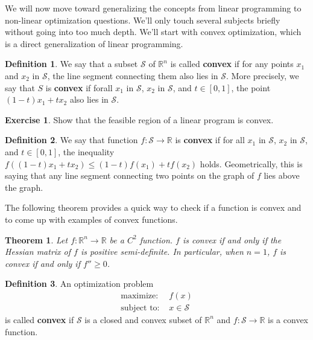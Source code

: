 \documentclass[
]{book}
\newtheorem{theorem}{Theorem}[chapter]
\theoremstyle{definition}
\newtheorem{definition}{Definition}[chapter]
\theoremstyle{definition}
\theoremstyle{definition}
\newtheorem{exercise}{Exercise}[chapter]
\theoremstyle{definition}
\theoremstyle{remark}
\begin{document}
We will now move toward generalizing the concepts from linear programming to non-linear optimization questions.
We'll only touch several subjects briefly without going into too much depth.
We'll start with convex optimization, which is a direct generalization of linear programming.

\begin{definition}
We say that a subset \(\mathcal{S}\) of \(\mathbb{R}^n\) is called \textbf{convex} if for any points \({x}_1\) and \({x}_2\) in \(\mathcal{S}\), the line segment connecting them also lies in \(\mathcal{S}\). More precisely, we say that \(S\) is \textbf{convex} if forall \({x}_1\) in \(\mathcal{S}\), \({x}_2\) in \(\mathcal{S}\), and \(t \in [0,1]\), the point \((1 - t) {x}_1 + t {x}_2\) also lies in \(\mathcal{S}\).
\end{definition}

\begin{exercise}
Show that the feasible region of a linear program is convex.
\end{exercise}

\begin{definition}
We say that function \(f : \mathcal{S} \to \mathbb{R}\) is \textbf{convex} if for all \({x}_1\) in \(\mathcal{S}\), \({x}_2\) in \(\mathcal{S}\), and \(t \in [0,1]\), the inequality \(f((1 - t) {x}_1 + t {x}_2) \le (1 - t) f({x}_1) + t f({x}_2)\) holds. Geometrically, this is saying that any line segment connecting two points on the graph of \(f\) lies above the graph.
\end{definition}

The following theorem provides a quick way to check if a function is convex and to come up with examples of convex functions.

\begin{theorem}
\protect\hypertarget{thm:convexity-second-derivative}{}\label{thm:convexity-second-derivative}Let \(f : \mathbb{R}^n \to \mathbb{R}\) be a \(C^2\) function. \(f\) is convex if and only if the Hessian matrix of \(f\) is positive semi-definite. In particular, when \(n = 1\), \(f\) is convex if and only if \(f'' \ge 0\).
\end{theorem}

\begin{definition}
An optimization problem
\begin{equation}
  \begin{array}{ll}
    \mbox{maximize: } & f(x)  \\ 
    \mbox{subject to: } & x \in \mathcal{S} 
  \end{array}
  \label{eq:convex-optimization-problem}
\end{equation}
is called \textbf{convex} if \(\mathcal{S}\) is a closed and convex subset of \(\mathbb{R}^n\) and \(f : \mathcal{S} \to \mathbb{R}\) is a convex function.
\end{definition}
\end{document}
